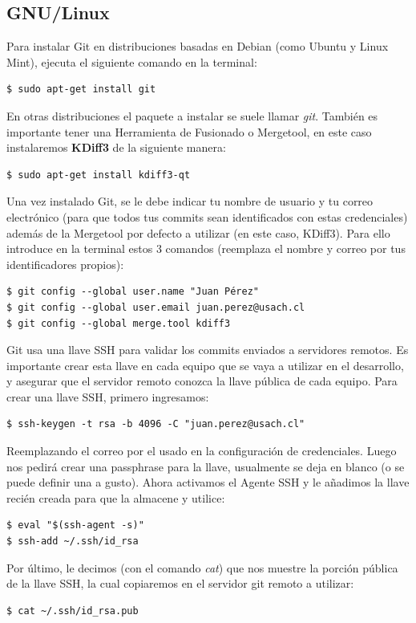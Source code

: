 \documentclass{article}
\begin{document}
\subsection{GNU/Linux}

Para instalar Git en distribuciones basadas en Debian (como Ubuntu y Linux Mint), ejecuta el siguiente comando en la terminal:
\begin{verbatim}
$ sudo apt-get install git
\end{verbatim}

En otras distribuciones el paquete a instalar se suele llamar \textit{git}. También es importante tener una Herramienta de Fusionado o Mergetool, en este caso instalaremos \textbf{KDiff3}\cite{kdiff} de la siguiente manera:
\begin{verbatim}
$ sudo apt-get install kdiff3-qt
\end{verbatim}

Una vez instalado Git, se le debe indicar tu nombre de usuario y tu correo electrónico (para que todos tus commits sean identificados con estas credenciales) además de la Mergetool por defecto a utilizar (en este caso, KDiff3). Para ello introduce en la terminal estos 3 comandos (reemplaza el nombre y correo por tus identificadores propios):
\begin{verbatim}
$ git config --global user.name "Juan Pérez"
$ git config --global user.email juan.perez@usach.cl
$ git config --global merge.tool kdiff3
\end{verbatim}

Git usa una llave SSH para validar los commits enviados a servidores remotos. Es importante crear esta llave en cada equipo que se vaya a utilizar en el desarrollo, y asegurar que el servidor remoto conozca la llave pública de cada equipo\cite{sshkey}. Para crear una llave SSH, primero ingresamos:
\begin{verbatim}
$ ssh-keygen -t rsa -b 4096 -C "juan.perez@usach.cl"
\end{verbatim}

Reemplazando el correo por el usado en la configuración de credenciales. Luego nos pedirá crear una passphrase para la llave, usualmente se deja en blanco (o se puede definir una a gusto). Ahora activamos el Agente SSH y le añadimos la llave recién creada para que la almacene y utilice:
\begin{verbatim}
$ eval "$(ssh-agent -s)"
$ ssh-add ~/.ssh/id_rsa
\end{verbatim}

Por último, le decimos (con el comando \textit{cat}) que nos muestre la porción pública de la llave SSH, la cual copiaremos en el servidor git remoto a utilizar:
\begin{verbatim}
$ cat ~/.ssh/id_rsa.pub
\end{verbatim}
\end{document}
